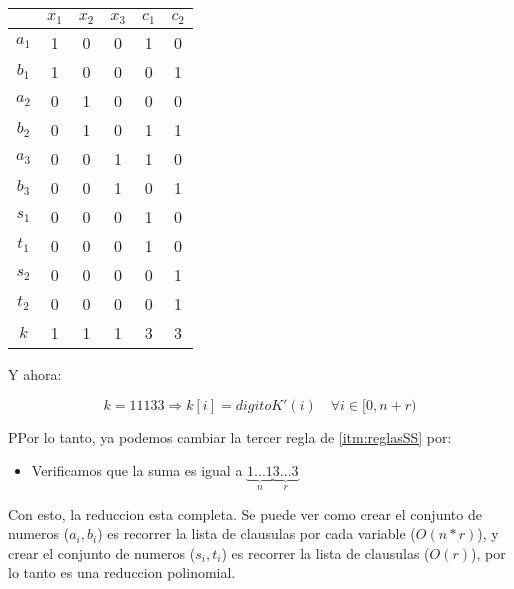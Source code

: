 \begin{table}[h!]
  \centering
  \begin{tabular}{ c|c c c | c c }
    & $x_1$ & $x_2$ & $x_3$ & $c_1$ & $c_2$ \\
    \hline 
    \rowcolor{green!30}
    $a_1$ & 1 & 0 & 0 & 1 & 0 \\
    $b_1$ & 1 & 0 & 0 & 0 & 1 \\
    $a_2$ & 0 & 1 & 0 & 0 & 0 \\
    \rowcolor{green!30}
    $b_2$ & 0 & 1 & 0 & 1 & 1 \\
    \rowcolor{green!30}
    $a_3$ & 0 & 0 & 1 & 1 & 0 \\
    $b_3$ & 0 & 0 & 1 & 0 & 1 \\
    \hline
    $s_1$ & 0 & 0 & 0 & 1 & 0 \\
    $t_1$ & 0 & 0 & 0 & 1 & 0 \\
    \rowcolor{green!30}
    $s_2$ & 0 & 0 & 0 & 0 & 1 \\
    \rowcolor{green!30}      
    $t_2$ & 0 & 0 & 0 & 0 & 1 \\
    \hline
    $k$ & 1 & 1 & 1 & 3 & 3 \\
  \end{tabular} 
\end{table}

Y ahora: 

\[
  k = 11133 \Rightarrow k[i] = digitoK'(i) \quad \forall i \in [0, n + r)
\]

PPor lo tanto, ya podemos cambiar la tercer regla de \ref{itm:reglasSS} por:
\begin{itemize}
  \item Verificamos que la suma es igual a 
    $\underbrace{1...1}_{n}\underbrace{3...3}_{r}$
\end{itemize}

Con esto, la reduccion esta completa. 
Se puede ver como crear el conjunto de numeros ($a_i, b_i$) es recorrer la lista 
de clausulas por cada variable ($O(n*r)$), y crear el conjunto de numeros 
($s_i, t_i$) es recorrer la lista de clausulas ($O(r)$), por lo tanto es 
una reduccion polinomial.

